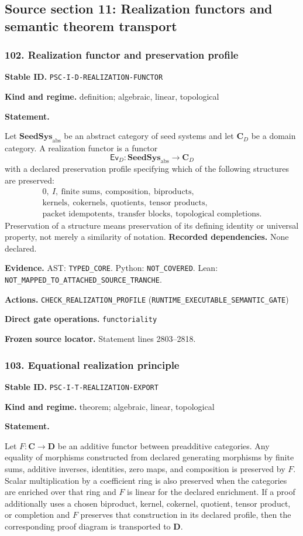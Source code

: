 \documentclass[a4paper,11pt]{article}
\newcommand{\field}[2]{\noindent\textbf{#1.} #2\par}
\begin{document}
\clearpage\subsection{Source section 11: Realization functors and semantic theorem transport}
\subsubsection*{102. Realization functor and preservation profile}
\label{rec:PSC-I-D-REALIZATION-FUNCTOR}
\field{Stable ID}{\nolinkurl{PSC-I-D-REALIZATION-FUNCTOR}}
\field{Kind and regime}{definition; algebraic, linear, topological}
\textbf{Statement.}\par
Let $\mathbf{SeedSys}_{\mathrm{abs}}$ be an abstract category of seed systems and let $\mathbf C_D$ be a domain category.  A realization functor is a functor
\[
\mathsf{Ev}_D:\mathbf{SeedSys}_{\mathrm{abs}}\longrightarrow\mathbf C_D
\]
with a declared preservation profile specifying which of the following structures are preserved:
\[
\begin{gathered}
0,\ I,\ \text{finite sums},\ \text{composition},\ \text{biproducts},\\
\text{kernels},\ \text{cokernels},\ \text{quotients},\ \text{tensor products},\\
\text{packet idempotents},\ \text{transfer blocks},\ \text{topological completions}.
\end{gathered}
\]
Preservation of a structure means preservation of its defining identity or universal property, not merely a similarity of notation.
\field{Recorded dependencies}{None declared.}
\field{Evidence}{AST: \nolinkurl{TYPED_CORE}. Python: \nolinkurl{NOT_COVERED}. Lean: \nolinkurl{NOT_MAPPED_TO_ATTACHED_SOURCE_TRANCHE}.}
\field{Actions}{\nolinkurl{CHECK_REALIZATION_PROFILE} (\nolinkurl{RUNTIME_EXECUTABLE_SEMANTIC_GATE})}
\field{Direct gate operations}{\nolinkurl{functoriality}}
\field{Frozen source locator}{Statement lines 2803--2818.}
\subsubsection*{103. Equational realization principle}
\label{rec:PSC-I-T-REALIZATION-EXPORT}
\field{Stable ID}{\nolinkurl{PSC-I-T-REALIZATION-EXPORT}}
\field{Kind and regime}{theorem; algebraic, linear, topological}
\textbf{Statement.}\par
Let $F:\mathbf C\to\mathbf D$ be an additive functor between preadditive categories.  Any equality of morphisms constructed from declared generating morphisms by finite sums, additive inverses, identities, zero maps, and composition is preserved by $F$.  Scalar multiplication by a coefficient ring is also preserved when the categories are enriched over that ring and $F$ is linear for the declared enrichment.  If a proof additionally uses a chosen biproduct, kernel, cokernel, quotient, tensor product, or completion and $F$ preserves that construction in its declared profile, then the corresponding proof diagram is transported to $\mathbf D$.
\end{document}
